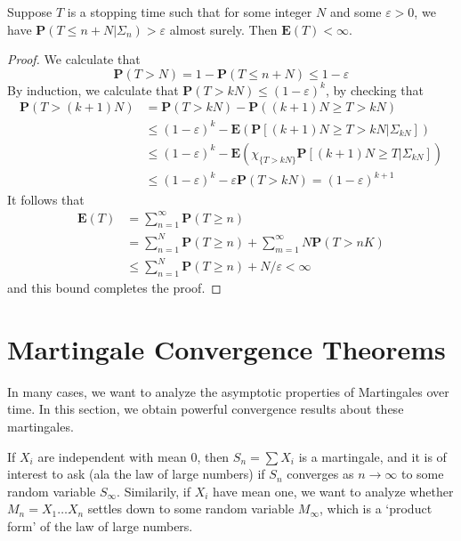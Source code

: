 \begin{lemma}
    Suppose $T$ is a stopping time such that for some integer $N$ and some $\varepsilon > 0$, we have $\mathbf{P}(T \leq n + N | \Sigma_n) > \varepsilon$ almost surely. Then $\mathbf{E}(T) < \infty$.
\end{lemma}
\begin{proof}
    We calculate that
    \[ \mathbf{P}(T > N) = 1 - \mathbf{P}(T \leq n + N) \leq 1 - \varepsilon \]
    By induction, we calculate that $\mathbf{P}(T > kN) \leq (1 - \varepsilon)^k$, by checking that
    \begin{align*}
        \mathbf{P}(T > (k+1)N) &= \mathbf{P}(T > kN) - \mathbf{P}((k+1)N \geq T > kN)\\
        &\leq (1 - \varepsilon)^k - \mathbf{E}(\mathbf{P}[(k+1)N \geq T > kN | \Sigma_{kN} ])\\
        &\leq (1 - \varepsilon)^k - \mathbf{E} \left( \chi_{\{ T > kN \}} \mathbf{P}[(k+1)N \geq T | \Sigma_{kN}] \right)\\
        &\leq (1 - \varepsilon)^k - \varepsilon \mathbf{P}(T > kN) = (1 - \varepsilon)^{k+1}
    \end{align*}
    It follows that
    \begin{align*}
        \mathbf{E}(T) &= \sum_{n = 1}^\infty \mathbf{P}(T \geq n)\\
        &= \sum_{n = 1}^N \mathbf{P}(T \geq n) + \sum_{m = 1}^\infty N \mathbf{P}(T > nK)\\
        &\leq \sum_{n = 1}^N \mathbf{P}(T \geq n) + N/\varepsilon < \infty
    \end{align*}
    and this bound completes the proof.
\end{proof}

\section{Martingale Convergence Theorems}

In many cases, we want to analyze the asymptotic properties of Martingales over time. In this section, we obtain powerful convergence results about these martingales.

\begin{example}
    If $X_i$ are independent with mean $0$, then $S_n = \sum X_i$ is a martingale, and it is of interest to ask (ala the law of large numbers) if $S_n$ converges as $n \to \infty$ to some random variable $S_\infty$. Similarily, if $X_i$ have mean one, we want to analyze whether $M_n = X_1 \dots X_n$ settles down to some random variable $M_\infty$, which is a `product form' of the law of large numbers.
\end{example}

